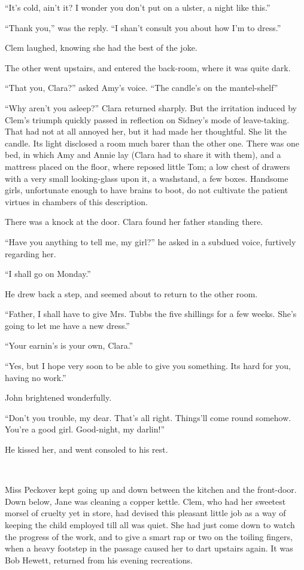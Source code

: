 ``It's cold, ain't it? I wonder you don't put on a ulster, a night like
this.''

``Thank you,'' was the reply. ``I shan't consult you about how I'm to
dress.''

Clem laughed, knowing she had the best of the joke.

The other went upstairs, and entered the back-room, where it was quite
dark.

``That you, Clara?'' asked Amy's voice. ``The candle's on the
mantel-shelf''

``Why aren't you asleep?'' Clara returned sharply. But the irritation
induced by Clem's triumph quickly passed in reflection on Sidney's mode
of leave-taking. That had not at all annoyed her, but it had made her
thoughtful. She lit the candle. Its light disclosed a room much barer
than the other one. There was one bed, in which Amy and Annie
{\protect\hypertarget{81}{}{}}lay (Clara had to share it with them), and
a mattress placed on the floor, where reposed little Tom; a low chest of
drawers with a very small looking-glass upon it, a washstand, a few
boxes. Handsome girls, unfortunate enough to have brains to boot, do not
cultivate the patient virtues in chambers of this description.

There was a knock at the door. Clara found her father standing there.

``Have you anything to tell me, my girl?'' he asked in a subdued voice,
furtively regarding her.

``I shall go on Monday.''

He drew back a step, and seemed about to return to the other room.

``Father, I shall have to give Mrs. Tubbs the five shillings for a few
weeks. She's going to let me have a new dress.''

``Your earnin's is your own, Clara.''

``Yes, but I hope very soon to be able to give you something. Its hard
for you, having no work.''

John brightened wonderfully.

{\protect\hypertarget{82}{}{}}``Don't you trouble, my dear. That's all
right. Things'll come round somehow. You're a good girl. Good-night, my
darlin!''

He kissed her, and went consoled to his rest.

~

Miss Peckover kept going up and down between the kitchen and the
front-door. Down below, Jane was cleaning a copper kettle. Clem, who had
her sweetest morsel of cruelty yet in store, had devised this pleasant
little job as a way of keeping the child employed till all was quiet.
She had just come down to watch the progress of the work, and to give a
smart rap or two on the toiling fingers, when a heavy footstep in the
passage caused her to dart upstairs again. It was Bob Hewett, returned
from his evening recreations.

